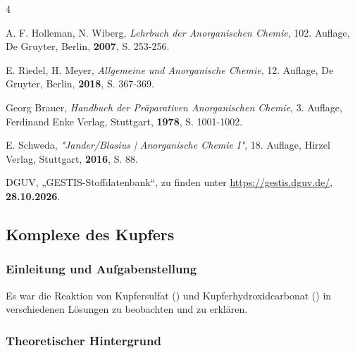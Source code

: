 \documentclass[
	a4paper,										%
	12pt,											%
	twoside,										%
	headsepline,								%
	footsepline,									%
	captions=tableheading,					%
]{scrartcl}
\begin{document}
\begin{thebibliography}{4}		%

						{A. F. Holleman, N. Wiberg}, 
			\textit	{Lehrbuch der Anorganischen Chemie}, 
						{102. Auflage}, 
						{De Gruyter}, 
						{Berlin}, 
			\textbf	{2007}, 
			S.			{253-256}.

						{E. Riedel, H. Meyer}, 
			\textit	{Allgemeine und Anorganische Chemie}, 
						{12. Auflage}, 
						{De Gruyter}, 
						{Berlin}, 
			\textbf	{2018}, 
			S.			{367-369}.

						{Georg Brauer}, 
			\textit	{Handbuch der Präparativen Anorganischen Chemie}, 
						{3. Auflage}, 
						{Ferdinand Enke Verlag}, 
						{Stuttgart}, 
			\textbf	{1978}, 
			S.			{1001-1002}.

						{E. Schweda}, 
			\textit	{"Jander/Blasius | Anorganische Chemie I"}, 
						{18. Auflage}, 
						{Hirzel Verlag}, 
						{Stuttgart}, 
			\textbf	{2016}, 
			S.			{88}.
	
						{DGUV}, 
						„{GESTIS-Stoffdatenbank}“, zu finden unter 
			\url		{https://gestis.dguv.de/}, 
			\textbf	{28.10.2026}.


\end{thebibliography}

\newpage

\setcounter{subsection}{2}							%
\setcounter{secnumdepth}{4}
	
\subsection{Komplexe des Kupfers}

\subsubsection{Einleitung und Aufgabenstellung}

	Es war die Reaktion von Kupfersulfat () und Kupferhydroxidcarbonat () in verschiedenen Lösungen zu beobachten und zu erklären.

\subsubsection{Theoretischer Hintergrund}
\end{document}
